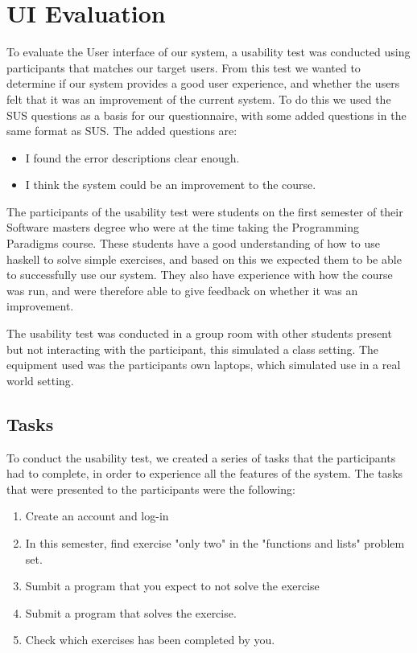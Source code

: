 \section{UI Evaluation} \label{UIEval}
To evaluate the User interface of our system, a usability test was conducted using participants that matches our target users. From this test we wanted to determine if our system provides a good user experience, and whether the users felt that it was an improvement of the current system.
To do this we used the SUS questions as a basis for our questionnaire, with some added questions in the same format as SUS. The added questions are:
\begin{itemize}
    \item I found the error descriptions clear enough.
    \item I think the system could be an improvement to the course.
\end{itemize}
The participants of the usability test were students on the first semester of their Software masters degree who were at the time taking the Programming Paradigms course. 
These students have a good understanding of how to use haskell to solve simple exercises, and based on this we expected them to be able to successfully use our system. They also have experience with how the course was run, and were therefore able to give feedback on whether it was an improvement.

The usability test was conducted in a group room with other students present but not interacting with the participant, this simulated a class setting. 
The equipment used was the participants own laptops, which simulated use in a real world setting.

\subsection*{Tasks}
To conduct the usability test, we created a series of tasks that the participants had to complete, in order to experience all the features of the system.
The tasks that were presented to the participants were the following:
\begin{enumerate}
    \item Create an account and log-in
    \item In this semester, find exercise "only two" in the "functions and lists" problem set.
    \item Sumbit a program that you expect to not solve the exercise
    \item Submit a program that solves the exercise.
    \item Check which exercises has been completed by you.
\end{enumerate}


